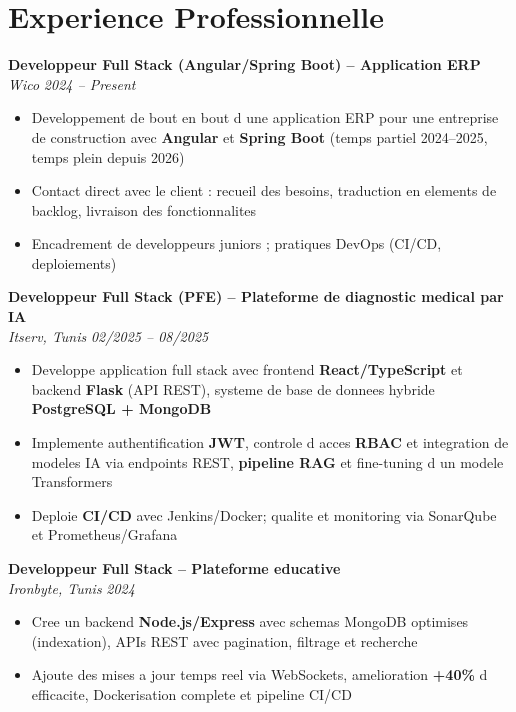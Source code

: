 \documentclass[10pt,a4paper]{article}
\begin{document}
\vspace{6pt}

\section*{Experience Professionnelle}
{\small

\textbf{Developpeur Full Stack (Angular/Spring Boot) -- Application ERP}\\[1pt]
\textit{Wico} \hfill \textit{2024 -- Present}
\begin{itemize}
  \item Developpement de bout en bout d une application ERP pour une entreprise de construction avec \textbf{Angular} et \textbf{Spring Boot} (temps partiel 2024--2025, temps plein depuis 2026)
  \item Contact direct avec le client : recueil des besoins, traduction en elements de backlog, livraison des fonctionnalites
  \item Encadrement de developpeurs juniors ; pratiques DevOps (CI/CD, deploiements)
\end{itemize}

\vspace{3pt}
\textbf{Developpeur Full Stack (PFE) -- Plateforme de diagnostic medical par IA}\\[1pt]
\textit{Itserv, Tunis} \hfill \textit{02/2025 -- 08/2025}
\begin{itemize}
  \item Developpe application full stack avec frontend \textbf{React/TypeScript} et backend \textbf{Flask} (API REST), systeme de base de donnees hybride \textbf{PostgreSQL + MongoDB}
  \item Implemente authentification \textbf{JWT}, controle d acces \textbf{RBAC} et integration de modeles IA via endpoints REST, \textbf{pipeline RAG} et fine-tuning d un modele Transformers
  \item Deploie \textbf{CI/CD} avec Jenkins/Docker; qualite et monitoring via SonarQube et Prometheus/Grafana
\end{itemize}

\vspace{3pt}
\textbf{Developpeur Full Stack -- Plateforme educative}\\[1pt]
\textit{Ironbyte, Tunis} \hfill \textit{2024}
\begin{itemize}
  \item Cree un backend \textbf{Node.js/Express} avec schemas MongoDB optimises (indexation), APIs REST avec pagination, filtrage et recherche
  \item Ajoute des mises a jour temps reel via WebSockets, amelioration \textbf{+40\%} d efficacite, Dockerisation complete et pipeline CI/CD
\end{itemize}

}
\end{document}
